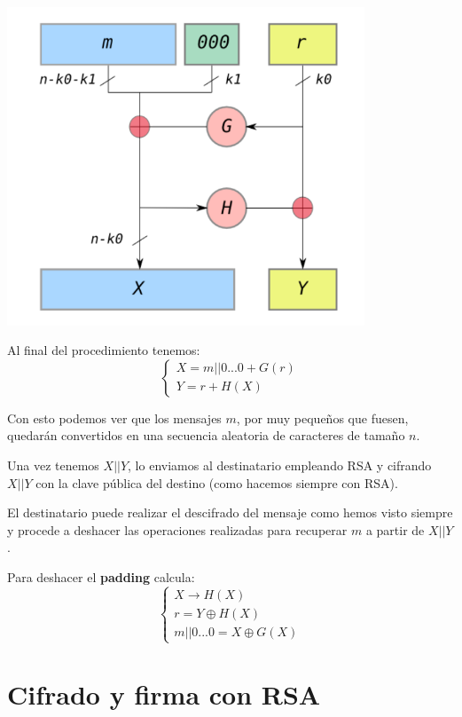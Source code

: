 \begin{center}

\includegraphics[width=0.8\textwidth]{img/Oaep-diagram-20080305.png}

Al final del procedimiento tenemos:
\[\left\{\begin{array}{l} X = m||0...0 + G(r) \\ Y=r+H(X)\end{array}\right.\]

\end{center}

Con esto podemos ver que los mensajes $m$, por muy pequeños que fuesen, quedarán convertidos en una secuencia aleatoria de caracteres de tamaño $n$.

Una vez tenemos $X||Y$, lo enviamos al destinatario empleando RSA y cifrando $X||Y$ con la clave pública del destino (como hacemos siempre con RSA).

El destinatario puede realizar el descifrado del mensaje como hemos visto siempre y procede a deshacer las operaciones realizadas para recuperar $m$ a partir de $X||Y$.

Para deshacer el \textbf{padding} calcula:
\[\left\{ \begin{array}{l} X \to H(X) \\
r=Y\oplus H(X) \\
m||0...0 = X\oplus G(X)\end{array}\right.\]

\section{Cifrado y firma con RSA}


